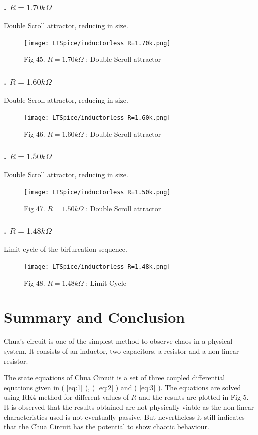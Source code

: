 \documentclass[12pt]{article}
\newcommand*{\myref}[1]{%
  \begingroup
    \hypersetup{
      linkcolor=linkequation,
      linkbordercolor=linkequation,
    }%
    \ref{#1}%
  \endgroup
}
\begin{document}
\subsubsection*{. $R=1.70k\Omega$}
Double Scroll attractor, reducing in size.
\begin{figure}[H] %
	\centering
	\texttt{[image: LTSpice/inductorless R=1.70k.png]}
	\caption{Fig 45. $R=1.70k\Omega$ : Double Scroll attractor}
\end{figure}
\subsubsection*{. $R=1.60k\Omega$}
Double Scroll attractor, reducing in size.
\begin{figure}[H] %
	\centering
	\texttt{[image: LTSpice/inductorless R=1.60k.png]}
	\caption{Fig 46. $R=1.60k\Omega$ : Double Scroll attractor}
\end{figure}
\subsubsection*{. $R=1.50k\Omega$}
Double Scroll attractor, reducing in size.
\begin{figure}[H] %
	\centering
	\texttt{[image: LTSpice/inductorless R=1.50k.png]}
	\caption{Fig 47. $R=1.50k\Omega$ : Double Scroll attractor}
\end{figure}
\subsubsection*{. $R=1.48k\Omega$}
Limit cycle of the birfurcation sequence.
\begin{figure}[H] %
	\centering
	\texttt{[image: LTSpice/inductorless R=1.48k.png]}
	\caption{Fig 48. $R=1.48k\Omega$ : Limit Cycle}
\end{figure}

\section{Summary and Conclusion}
Chua's circuit is one of the simplest method to observe chaos in a physical system. It consists of an inductor, two capacitors, a resistor and a non-linear resistor. 
\linebreak

The state equations of Chua Circuit is a set of three coupled differential equations given in (\myref{eq:1}), (\myref{eq:2}) and (\myref{eq:3}). The equations are solved using RK4 method for different values of $R$ and the results are plotted in Fig 5. It is observed that the results obtained are not physically viable as the non-linear characteristics used is not eventually passive. But nevertheless it still indicates that the Chua Circuit has the potential to show chaotic behaviour.\linebreak
\end{document}
